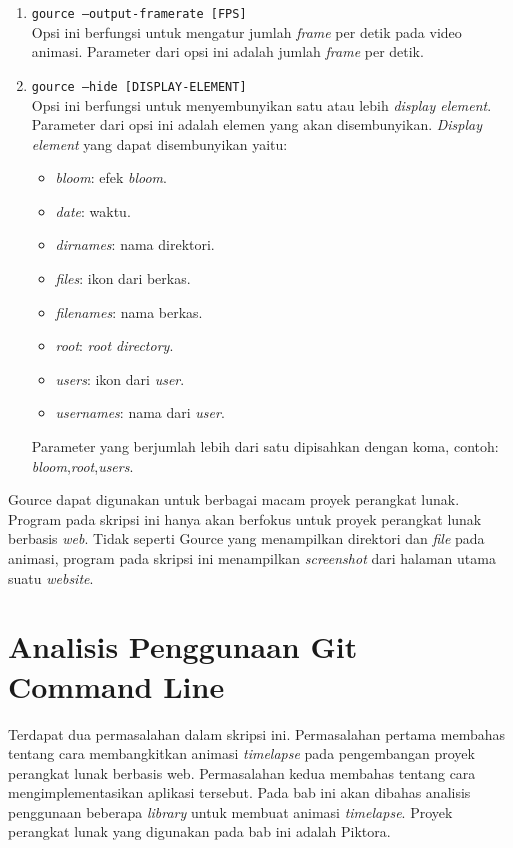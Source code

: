 \begin{enumerate}
\item \texttt{gource --output-framerate [FPS]}\\
Opsi ini berfungsi untuk mengatur jumlah \textit{frame} per detik pada video animasi. Parameter dari opsi ini adalah jumlah \textit{frame} per detik.

\item \texttt{gource --hide [DISPLAY-ELEMENT]}\\
Opsi ini berfungsi untuk menyembunyikan satu atau lebih \textit{display element}. Parameter dari opsi ini adalah elemen yang akan disembunyikan. \textit{Display element} yang dapat disembunyikan yaitu:
\begin{itemize}
\item \textit{bloom}: efek \textit{bloom}. 
\item \textit{date}: waktu.  
\item \textit{dirnames}: nama direktori. 
\item \textit{files}: ikon dari berkas. 
\item \textit{filenames}: nama berkas. 
\item \textit{root}: \textit{root directory}.
\item \textit{users}: ikon dari \textit{user}.
\item \textit{usernames}: nama dari \textit{user}.
\end{itemize}
Parameter yang berjumlah lebih dari satu dipisahkan dengan koma, contoh: \textit{bloom},\textit{root},\textit{users}.
\end{enumerate}
 
Gource dapat digunakan untuk berbagai macam proyek perangkat lunak. Program pada skripsi ini hanya akan berfokus untuk proyek perangkat lunak berbasis \textit{web}. Tidak seperti Gource yang menampilkan direktori dan \textit{file} pada animasi, program pada skripsi ini menampilkan \textit{screenshot} dari halaman utama suatu \textit{website}.      
 
 \section{Analisis Penggunaan Git Command Line}
\label{sec:analisis_git}

Terdapat dua permasalahan dalam skripsi ini. Permasalahan pertama membahas tentang cara membangkitkan animasi \textit{timelapse} pada pengembangan proyek perangkat lunak berbasis web. Permasalahan kedua membahas tentang cara mengimplementasikan aplikasi tersebut. Pada bab ini akan dibahas analisis penggunaan beberapa \textit{library} untuk membuat animasi \textit{timelapse}. Proyek perangkat lunak yang digunakan pada bab ini adalah Piktora. 

